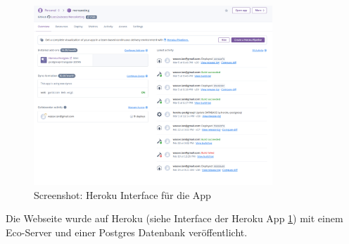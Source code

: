 \begin{figure}[ht]
    \centering
    \includegraphics[width=0.8\textwidth]{images/Heroku.png}
    \caption{Screenshot: Heroku Interface für die App}
    \label{fig:r-deployment}
\end{figure}

Die Webseite wurde auf Heroku (siehe Interface der Heroku App
\ref{fig:r-deployment}) mit einem Eco-Server und einer Postgres Datenbank
veröffentlicht.




